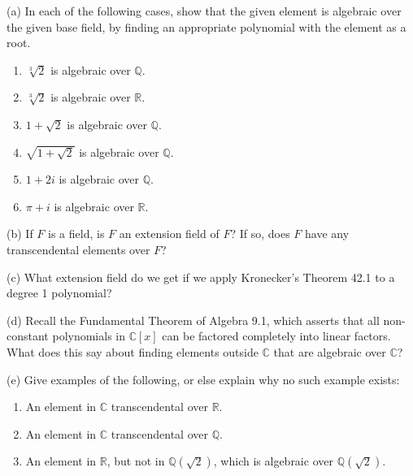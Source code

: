 \newpage
\begin{problem}[Warmup]{(a)}
    In each of the following cases, show that the given element is algebraic over the given base field, by finding an appropriate polynomial with the element as a root.
    \begin{enumerate}
        \item[(a)] $\sqrt[3]{2}$ is algebraic over $\mathbb{Q}$.
        \item[(b)] $\sqrt[3]{2}$ is algebraic over $\mathbb{R}$.
        \item[(c)] $1 + \sqrt{2}$ is algebraic over $\mathbb{Q}$.
        \item[(d)] $\sqrt{1 + \sqrt{2}}$ is algebraic over $\mathbb{Q}$.
        \item[(e)] $1 + 2i$ is algebraic over $\mathbb{Q}$.
        \item[(f)] $\pi + i$ is algebraic over $\mathbb{R}$.
    \end{enumerate}
\end{problem}
\unsolved

\begin{problem}[Warmup]{(b)}
    If $F$ is a field, is $F$ an extension field of $F$? If so, does $F$ have any transcendental elements over $F$?
\end{problem}
\unsolved

\begin{problem}[Warmup]{(c)}
    What extension field do we get if we apply Kronecker's Theorem 42.1 to a degree 1 polynomial?
\end{problem}
\unsolved

\begin{problem}[Warmup]{(d)}
    Recall the Fundamental Theorem of Algebra 9.1, which asserts that all non-constant polynomials in $\mathbb{C}[x]$ can be factored completely into linear factors. What does this say about finding elements outside $\mathbb{C}$ that are algebraic over $\mathbb{C}$?
\end{problem}
\unsolved

\begin{problem}[Warmup]{(e)}
    Give examples of the following, or else explain why no such example exists:
    \begin{enumerate}
        \item[(a)] An element in $\mathbb{C}$ transcendental over $\mathbb{R}$.
        \item[(b)] An element in $\mathbb{C}$ transcendental over $\mathbb{Q}$.
        \item[(c)] An element in $\mathbb{R}$, but not in $\mathbb{Q}(\sqrt{2})$, which is algebraic over $\mathbb{Q}(\sqrt{2})$.
    \end{enumerate}
\end{problem}
\unsolved

